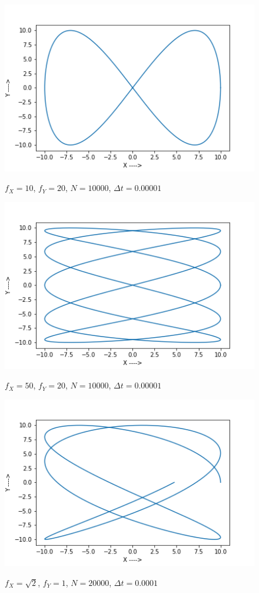 \documentclass{report}
\begin{document}
\begin{figure}[H]
	\centering
	\includegraphics[width = \textwidth]{10-20.png}
	\label{closed2}
	\caption{$f_X=10$, $f_Y=20$, $N=10000$, $\Delta t=0.00001$}
\end{figure}
\begin{figure}[H]
	\centering
	\includegraphics[width = \textwidth]{50-20.png}
	\label{closed3}
	\caption{$f_X=50$, $f_Y=20$, $N=10000$, $\Delta t=0.00001$}
\end{figure}
\begin{figure}[H]
	\centering
	\includegraphics[width = \textwidth]{sqrt2.png}
	\label{open1}
	\caption{$f_X=\sqrt{2}$, $f_Y=1$, $N=20000$, $\Delta t=0.0001$}
\end{figure}
\end{document}
